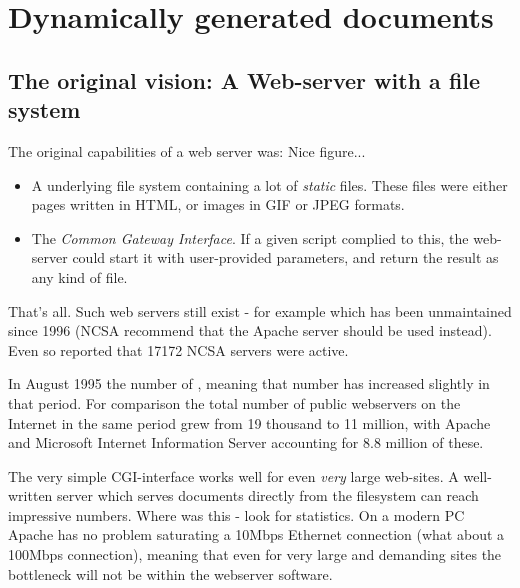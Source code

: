 

\chapter{Dynamically generated documents}
\label{cha:dynamically-generated-documents}


\section{The original vision: A Web-server with a file system }

The original capabilities of a web server was: \textsf{Nice figure...}

\begin{itemize}
\item A underlying file system containing a lot of \textit{static}
files.  These files were either pages written in HTML, or images in
GIF or JPEG formats.

\item The \textit{Common Gateway Interface}.  If a given script
complied to this, the web-server could start it with user-provided
parameters, and return the result as any kind of file.
\end{itemize}

That's all.  Such web servers still exist - for example
 which has been
unmaintained since 1996 (NCSA recommend that the Apache server should
be used instead).  Even so
 reported that \textsf{17172} NCSA servers were
active.

In August 1995 the number of
, meaning that number has increased slightly
in that period.  For comparison the total number of public webservers
on the Internet in the same period grew from 19 thousand to 11
million, with Apache and Microsoft Internet Information Server
accounting for 8.8 million of these.

The very simple CGI-interface works well for even \textit{very} large
web-sites.  A well-written server which serves documents directly from
the filesystem can reach impressive numbers.  \textsf{Where was this -
  look for statistics}.  On a modern PC Apache has no problem
saturating a 10Mbps Ethernet connection (\textsf{what about a 100Mbps
  connection)}, meaning that even for very large and demanding sites
the bottleneck will not be within the webserver software.

